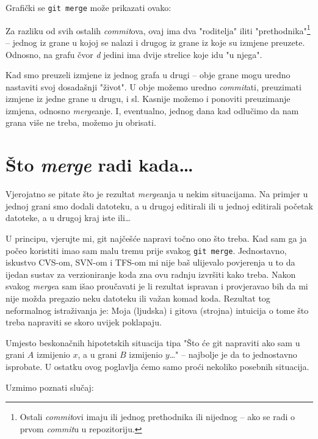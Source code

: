 Grafički se \verb+git merge+ može prikazati ovako:



Za razliku od svih ostalih \emph{commit}ova, ovaj ima dva "roditelja" iliti "prethodnika"\footnote{Ostali \emph{commit}ovi imaju ili jednog prethodnika ili nijednog -- ako se radi o prvom \emph{commit}u u repozitoriju.} -- jednog iz grane u kojoj se nalazi i drugog iz grane iz koje su izmjene preuzete.
Odnosno, na grafu čvor \emph d jedini ima dvije strelice koje idu "u njega".

Kad smo preuzeli izmjene iz jednog grafa u drugi -- obje grane mogu uredno nastaviti svoj dosadašnji "život".
U obje možemo uredno \emph{commit}ati, preuzimati izmjene iz jedne grane u drugu, i sl.
Kasnije možemo i ponoviti preuzimanje izmjena, odnosno \emph{merge}anje.
I, eventualno, jednog dana kad odlučimo da nam grana više ne treba, možemo ju obrisati.

\section*{Što \emph{merge} radi kada\dots}

Vjerojatno se pitate što je rezultat \emph{merge}anja u nekim situacijama.
Na primjer u jednoj grani smo dodali datoteku, a u drugoj editirali ili u jednoj editirali početak datoteke, a u drugoj kraj iste ili\dots

U principu, vjerujte mi, git najčešće napravi točno ono što treba. 
Kad sam ga ja počeo koristiti imao sam malu tremu prije svakog \verb+git merge+.
Jednostavno, iskustvo CVS-om, SVN-om i TFS-om mi nije baš ulijevalo povjerenja u to da ijedan sustav za verzioniranje koda zna ovu radnju izvršiti kako treba.
Nakon svakog \emph{merge}a sam išao proučavati je li rezultat ispravan i provjeravao bih da mi nije možda pregazio neku datoteku ili važan komad koda.
Rezultat tog neformalnog istraživanja je: Moja (ljudska) i gitova (strojna) intuicija o tome što treba napraviti se skoro uvijek poklapaju.

Umjesto beskonačnih hipotetskih situacija tipa "Što će git napraviti ako sam u grani $A$ izmijenio $x$, a u grani $B$ izmijenio $y$\dots" -- najbolje je da to jednostavno isprobate. 
U ostatku ovog poglavlja ćemo samo proći nekoliko posebnih situacija.

Uzmimo poznati slučaj:



